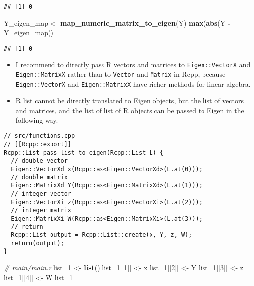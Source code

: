 \documentclass[
]{book}
\newenvironment{Shaded}{\begin{snugshade}}{\end{snugshade}}
\newcommand{\CommentTok}[1]{\textcolor[rgb]{0.56,0.35,0.01}{\textit{#1}}}
\newcommand{\DecValTok}[1]{\textcolor[rgb]{0.00,0.00,0.81}{#1}}
\newcommand{\FunctionTok}[1]{\textcolor[rgb]{0.13,0.29,0.53}{\textbf{#1}}}
\newcommand{\NormalTok}[1]{#1}
\newcommand{\OtherTok}[1]{\textcolor[rgb]{0.56,0.35,0.01}{#1}}
\newcommand{\SpecialCharTok}[1]{\textcolor[rgb]{0.81,0.36,0.00}{\textbf{#1}}}
\begin{document}
\begin{verbatim}
## [1] 0
\end{verbatim}

\begin{Shaded}
\begin{Highlighting}[]
\NormalTok{Y\_eigen\_map }\OtherTok{\textless{}{-}} \FunctionTok{map\_numeric\_matrix\_to\_eigen}\NormalTok{(Y)}
\FunctionTok{max}\NormalTok{(}\FunctionTok{abs}\NormalTok{(Y }\SpecialCharTok{{-}}\NormalTok{ Y\_eigen\_map))}
\end{Highlighting}
\end{Shaded}

\begin{verbatim}
## [1] 0
\end{verbatim}

\begin{itemize}
\item
  I recommend to directly pass R vectors and matrices to \texttt{Eigen::VectorX} and \texttt{Eigen::MatrixX} rather than to \texttt{Vector} and \texttt{Matrix} in Rcpp, because \texttt{Eigen::VectorX} and \texttt{Eigen::MatrixX} have richer methods for linear algebra.
\item
  R list cannot be directly translated to Eigen objects, but the list of vectors and matrices, and the list of list of R objects can be passed to Eigen in the following way.
\end{itemize}

\begin{verbatim}
// src/functions.cpp
// [[Rcpp::export]]
Rcpp::List pass_list_to_eigen(Rcpp::List L) {
  // double vector
  Eigen::VectorXd x(Rcpp::as<Eigen::VectorXd>(L.at(0)));
  // double matrix
  Eigen::MatrixXd Y(Rcpp::as<Eigen::MatrixXd>(L.at(1)));
  // integer vector
  Eigen::VectorXi z(Rcpp::as<Eigen::VectorXi>(L.at(2)));
  // integer matrix
  Eigen::MatrixXi W(Rcpp::as<Eigen::MatrixXi>(L.at(3)));
  // return
  Rcpp::List output = Rcpp::List::create(x, Y, z, W);
  return(output);
}
\end{verbatim}

\begin{Shaded}
\begin{Highlighting}[]
\CommentTok{\# main/main.r}
\NormalTok{list\_1 }\OtherTok{\textless{}{-}} \FunctionTok{list}\NormalTok{()}
\NormalTok{list\_1[[}\DecValTok{1}\NormalTok{]] }\OtherTok{\textless{}{-}}\NormalTok{ x}
\NormalTok{list\_1[[}\DecValTok{2}\NormalTok{]] }\OtherTok{\textless{}{-}}\NormalTok{ Y}
\NormalTok{list\_1[[}\DecValTok{3}\NormalTok{]] }\OtherTok{\textless{}{-}}\NormalTok{ z}
\NormalTok{list\_1[[}\DecValTok{4}\NormalTok{]] }\OtherTok{\textless{}{-}}\NormalTok{ W}
\NormalTok{list\_1}
\end{Highlighting}
\end{Shaded}
\end{document}
